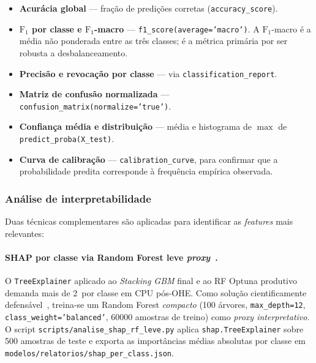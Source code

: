 \begin{itemize}
  \item \textbf{Acurácia global} --- fração de predições corretas (\texttt{accuracy\_score}).
  \item \textbf{\(\text{F}_1\) por classe e \(\text{F}_1\)-macro} --- \texttt{f1\_score(average='macro')}. A \(\text{F}_1\)-macro é a média não ponderada entre as três classes; é a métrica primária por ser robusta a desbalanceamento.
  \item \textbf{Precisão e revocação por classe} --- via \texttt{classification\_report}.
  \item \textbf{Matriz de confusão normalizada} --- \texttt{confusion\_matrix(normalize='true')}.
  \item \textbf{Confiança média e distribuição} --- média e histograma de \(\max\) de \texttt{predict\_proba(X\_test)}.
  \item \textbf{Curva de calibração} --- \texttt{calibration\_curve}, para confirmar que a probabilidade predita corresponde à frequência empírica observada.
\end{itemize}

\subsubsection{Análise de interpretabilidade}
\label{subsec:metod_interpretabilidade}

Duas técnicas complementares são aplicadas para identificar as \emph{features} mais relevantes:

\paragraph{SHAP por classe via Random Forest leve \emph{proxy}~\cite{lundberg2017unified,lundberg2020local}.} O \texttt{TreeExplainer} aplicado ao \emph{Stacking GBM} final e ao RF Optuna produtivo demanda mais de \num{2}\, por classe em CPU pós-OHE. Como solução cientificamente defensável~\cite{lundberg2020local}, treina-se um Random Forest \emph{compacto} (100 árvores, \texttt{max\_depth=12}, \texttt{class\_weight='balanced'}, \num{60000} amostras de treino) como \emph{proxy interpretativo}. O script \texttt{scripts/analise\_shap\_rf\_leve.py} aplica \texttt{shap.TreeExplainer} sobre 500 amostras de teste e exporta as importâncias médias absolutas por classe em \texttt{modelos/relatorios/shap\_per\_class.json}.

